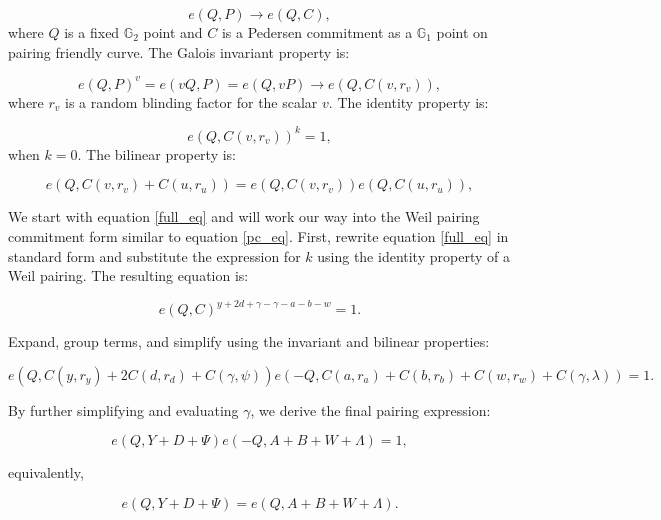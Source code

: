 \documentclass{iacrcc}
\theoremstyle{definition}
\begin{document}
\begin{equation}
e(Q, P) \rightarrow e(Q, C),
\end{equation}
where \( Q \) is a fixed \( \mathbb{G}_{2} \) point and \(C\) is a Pedersen commitment as a \( \mathbb{G}_{1} \) point on pairing friendly curve. The Galois invariant property is:

\begin{equation}
e(Q, P)^v = e(v Q, P) = e(Q, v P) \rightarrow e(Q, C(v, r_{v})),
\end{equation}
where $r_{v}$ is a random blinding factor for the scalar $v$. The identity property is:

\begin{equation}
e(Q, C(v, r_{v}))^{k} = 1,
\end{equation}
when \( k = 0 \). The bilinear property is:

\begin{equation}
e(Q, C(v, r_{v}) + C(u, r_{u})) = e(Q, C(v, r_{v}))e(Q, C(u, r_{u})),
\end{equation}

We start with equation \ref{full_eq} and will work our way into the Weil pairing commitment form similar to equation \ref{pc_eq}. First, rewrite equation \ref{full_eq} in standard form and substitute the expression for \( k \) using the identity property of a Weil pairing. The resulting equation is:

\begin{equation}
e(Q, C)^{y + 2d + \gamma - \gamma - a - b - w} = 1.
\end{equation}

Expand, group terms, and simplify using the invariant and bilinear properties:

\begin{equation}
e(Q, C(y, r_{y}) + 2 C(d, r_{d}) + C(\gamma, \psi))e(-Q, C(a, r_{a}) + C(b, r_{b}) + C(w, r_{w}) + C(\gamma, \lambda)) = 1.
\end{equation}

By further simplifying and evaluating \( \gamma \), we derive the final pairing expression:

\begin{equation}
e(Q, Y + D + \Psi)e(-Q, A + B + W + \Lambda) = 1,
\end{equation}

equivalently,

\begin{equation}
  e(Q, Y + D + \Psi) = e(Q, A + B + W + \Lambda).
  \end{equation}
\end{document}
